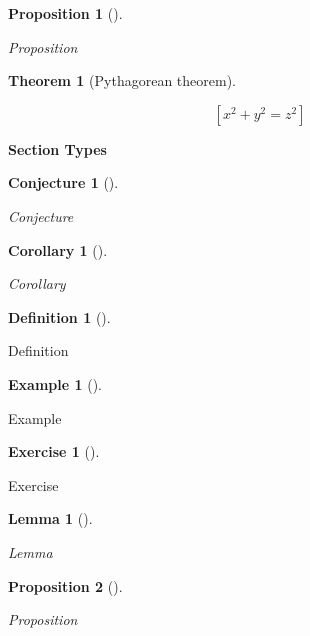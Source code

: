 \documentclass[
  12pt,
  a4paper,
  oneside,
  numbers=noenddot,
  titlepage,
  toclink=all,
  toc=bibliography]{scrbook}
\theoremstyle{definition}
\newtheorem{exercise}{Exercise}[section]
\theoremstyle{definition}
\newtheorem{example}{Example}[section]
\theoremstyle{definition}
\newtheorem{definition}{Definition}[section]
\theoremstyle{plain}
\newtheorem{conjecture}{Conjecture}[section]
\theoremstyle{plain}
\newtheorem{corollary}{Corollary}[section]
\theoremstyle{plain}
\newtheorem{proposition}{Proposition}[section]
\theoremstyle{plain}
\newtheorem{theorem}{Theorem}[section]
\theoremstyle{plain}
\newtheorem{lemma}{Lemma}[section]
\theoremstyle{remark}
\begin{document}
\begin{proposition}[]\protect\hypertarget{prp-scriv4}{}\label{prp-scriv4}

Proposition

\end{proposition}

\begin{theorem}[Pythagorean
theorem]\protect\hypertarget{thm-scriv4}{}\label{thm-scriv4}

\[[ x^2 + y^2 = z^2 ]\]

\end{theorem}

\textbf{Section Types}

\begin{conjecture}[]\protect\hypertarget{cnj-scriv5}{}\label{cnj-scriv5}

Conjecture

\end{conjecture}

\begin{corollary}[]\protect\hypertarget{cor-scriv6}{}\label{cor-scriv6}

Corollary

\end{corollary}

\begin{definition}[]\protect\hypertarget{def-scriv7}{}\label{def-scriv7}

Definition

\end{definition}

\begin{example}[]\protect\hypertarget{exm-scriv8}{}\label{exm-scriv8}

Example

\end{example}

\begin{exercise}[]\protect\hypertarget{exr-scriv9}{}\label{exr-scriv9}

Exercise

\end{exercise}

\begin{lemma}[]\protect\hypertarget{lem-scriv10}{}\label{lem-scriv10}

Lemma

\end{lemma}

\begin{proposition}[]\protect\hypertarget{prp-scriv11}{}\label{prp-scriv11}

Proposition

\end{proposition}
\end{document}
